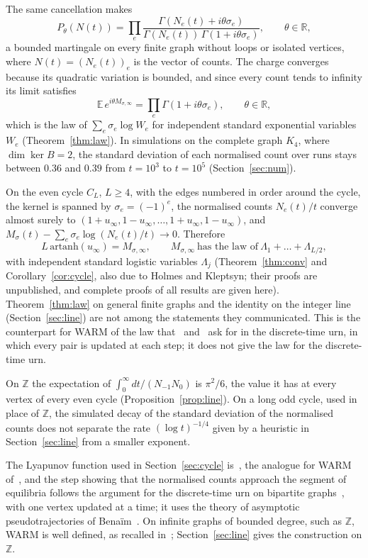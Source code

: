 \documentclass[11pt]{amsart}
\theoremstyle{remark}\newtheorem{remark}[theorem]{Remark}
\begin{document}
The same cancellation makes
\[ P_\theta(N(t))=\prod_e\frac{\Gamma(N_e(t)+i\theta\sigma_e)}{\Gamma(N_e(t))\,\Gamma(1+i\theta\sigma_e)},\qquad\theta\in\mathbb{R}, \]
a bounded martingale on every finite graph without loops or isolated vertices, where $N(t)=(N_e(t))_{e}$ is the vector of counts. The charge converges because its quadratic variation is bounded, and
since every count tends to infinity its limit satisfies
\[ \mathbb{E}\,e^{i\theta M_{\sigma,\infty}}=\prod_e\Gamma(1+i\theta\sigma_e),\qquad\theta\in\mathbb{R}, \]
which is the law of $\sum_e\sigma_e\log W_e$ for independent standard exponential variables $W_e$
(Theorem~\ref{thm:law}). In simulations on the complete graph $K_4$, where $\dim\ker B=2$, the standard
deviation of each normalised count over runs stays between $0.36$ and $0.39$ from $t=10^3$ to $t=10^5$
(Section~\ref{sec:num}).

On the even cycle $C_L$, $L\ge4$, with the edges numbered in order around the cycle, the kernel is spanned
by $\sigma_e=(-1)^e$, the normalised counts
$N_e(t)/t$ converge almost surely to $(1+u_\infty,1-u_\infty,\dots,1+u_\infty,1-u_\infty)$, and
$M_\sigma(t)-\sum_e\sigma_e\log(N_e(t)/t)\to0$. Therefore
\[ L\,\mathrm{artanh}(u_\infty)=M_{\sigma,\infty},\qquad M_{\sigma,\infty}\ \text{has the law of}\
   \Lambda_1+\dots+\Lambda_{L/2}, \]
with independent standard logistic variables $\Lambda_j$ (Theorem~\ref{thm:conv} and Corollary~\ref{cor:cycle},
also due to Holmes and Kleptsyn; their proofs are unpublished, and complete proofs of all results are given here). Theorem~\ref{thm:law} on general finite graphs and the identity on the integer line (Section~\ref{sec:line}) are not among the statements they communicated. This
is the counterpart for WARM of the law that~\cite{CL} and~\cite[Question~1]{Lima} ask for in the
discrete-time urn, in which every pair is updated at each step; it does not give the law for the discrete-time urn.

On $\mathbb{Z}$
the expectation of $\int_0^\infty dt/(N_{-1}N_0)$ is $\pi^2/6$, the value it has at every vertex of every even cycle
(Proposition~\ref{prop:line}). On a long odd cycle, used in place of $\mathbb{Z}$, the simulated decay of the standard deviation of the normalised
counts does not separate the rate $(\log t)^{-1/4}$ given by a heuristic in
Section~\ref{sec:line} from a smaller exponent.

The Lyapunov function used in Section~\ref{sec:cycle}
is~\cite[Lemma~A.3]{HHKR}, the analogue for WARM of~\cite[Lemma~4.1]{BBCL}, and the step showing that the normalised
counts approach the segment of equilibria follows the argument for the discrete-time urn on bipartite
graphs~\cite[Theorem~1.1(b)]{BBCL}, with one vertex updated at a time; it uses the theory of asymptotic
pseudotrajectories of Bena\"im~\cite{Ben99}. On infinite graphs of bounded degree, such as $\mathbb{Z}$, WARM is
well defined, as recalled in~\cite[Section~1]{HHKtree}; Section~\ref{sec:line} gives the construction on $\mathbb{Z}$.
\end{document}
